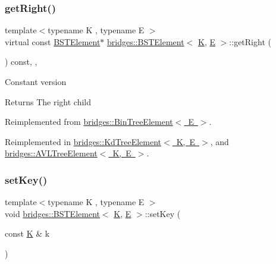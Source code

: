 \subsubsection{\texorpdfstring{getRight()}{getRight()}\hspace{0.1cm}{\footnotesize\ttfamily [2/2]}}
{\footnotesize\ttfamily template$<$typename K , typename E $>$ \\
virtual const \mbox{\hyperlink{classbridges_1_1_b_s_t_element}{B\+S\+T\+Element}}$\ast$ \mbox{\hyperlink{classbridges_1_1_b_s_t_element}{bridges\+::\+B\+S\+T\+Element}}$<$ \mbox{\hyperlink{namespacebridges_acfb0a4f7877d8f63de3e6862004c50edaa5f3c6a11b03839d46af9fb43c97c188}{K}}, \mbox{\hyperlink{namespacebridges_acfb0a4f7877d8f63de3e6862004c50eda3a3ea00cfc35332cedf6e5e9a32e94da}{E}} $>$\+::get\+Right (\begin{DoxyParamCaption}{ }\end{DoxyParamCaption}) const\hspace{0.3cm}{\ttfamily [inline]}, {\ttfamily [override]}, {\ttfamily [virtual]}}

Constant version

\begin{DoxyReturn}{Returns}
The right child 
\end{DoxyReturn}


Reimplemented from \mbox{\hyperlink{classbridges_1_1_bin_tree_element_aa01980f4be18f6c205580ea0376a0d07}{bridges\+::\+Bin\+Tree\+Element$<$ E $>$}}.



Reimplemented in \mbox{\hyperlink{classbridges_1_1_kd_tree_element_a48e6a81eccf6d156e50865ef8066be82}{bridges\+::\+Kd\+Tree\+Element$<$ K, E $>$}}, and \mbox{\hyperlink{classbridges_1_1_a_v_l_tree_element_a2f6fd127f3a04fcc5be60299b7d98f12}{bridges\+::\+A\+V\+L\+Tree\+Element$<$ K, E $>$}}.

\mbox{\label{classbridges_1_1_b_s_t_element_ae9edfa178c3b2d8bbaa7bd248bc469ce}} 
\subsubsection{\texorpdfstring{setKey()}{setKey()}}
{\footnotesize\ttfamily template$<$typename K , typename E $>$ \\
void \mbox{\hyperlink{classbridges_1_1_b_s_t_element}{bridges\+::\+B\+S\+T\+Element}}$<$ \mbox{\hyperlink{namespacebridges_acfb0a4f7877d8f63de3e6862004c50edaa5f3c6a11b03839d46af9fb43c97c188}{K}}, \mbox{\hyperlink{namespacebridges_acfb0a4f7877d8f63de3e6862004c50eda3a3ea00cfc35332cedf6e5e9a32e94da}{E}} $>$\+::set\+Key (\begin{DoxyParamCaption}\item[{const \mbox{\hyperlink{namespacebridges_acfb0a4f7877d8f63de3e6862004c50edaa5f3c6a11b03839d46af9fb43c97c188}{K}} \&}]{k }\end{DoxyParamCaption})\hspace{0.3cm}{\ttfamily [inline]}}


